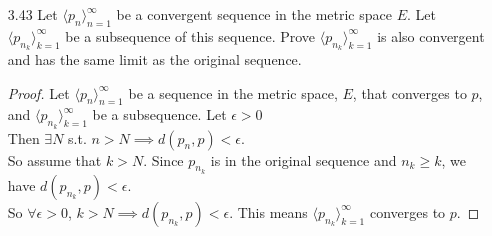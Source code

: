 \documentclass[14pt]{extarticle}
\begin{document}
\begin{enumerate}
		\item[3.43] Let $\langle p_n \rangle^\infty_{n=1}$ be a convergent sequence in the metric space $E$. Let $\langle p_{n_k} \rangle^\infty_{k=1}$ be a subsequence of this sequence. Prove $\langle p_{n_k} \rangle^\infty_{k=1}$ is also convergent and has the same limit as the original sequence.
		\begin{proof}
			Let $\langle p_n \rangle^\infty_{n=1}$ be a sequence in the metric space, $E$, that converges to $p$, and $\langle p_{n_k} \rangle^\infty_{k=1}$ be a subsequence. Let $\epsilon >0$\\
			Then $\exists N$ s.t. $n>N \implies d(p_n,p) < \epsilon$.\\
			So assume that $k>N$. Since $p_{n_k}$ is in the original sequence and $n_k\geq k$, we have $d(p_{n_k},p) < \epsilon$.\\
			So $\forall\epsilon>0$, $k>N \implies d(p_{n_k},p) < \epsilon$. This means $\langle p_{n_k} \rangle^\infty_{k=1}$ converges to $p$.
		\end{proof}
	\end{enumerate}
\end{document}
